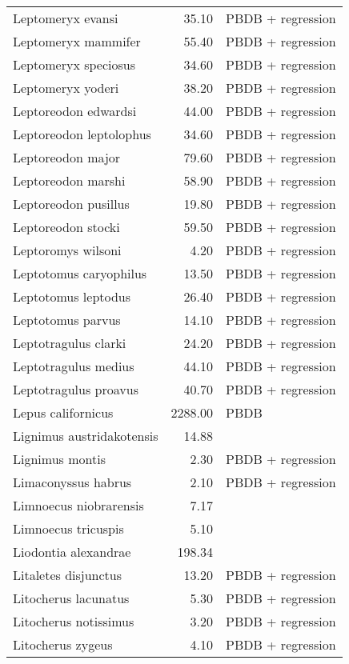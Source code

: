 \begin{table}[ht]
\begin{tabular}{lrl}
  Leptomeryx evansi & 35.10 & PBDB + regression \\ 
  Leptomeryx mammifer & 55.40 & PBDB + regression \\ 
  Leptomeryx speciosus & 34.60 & PBDB + regression \\ 
  Leptomeryx yoderi & 38.20 & PBDB + regression \\ 
  Leptoreodon edwardsi & 44.00 & PBDB + regression \\ 
  Leptoreodon leptolophus & 34.60 & PBDB + regression \\ 
  Leptoreodon major & 79.60 & PBDB + regression \\ 
  Leptoreodon marshi & 58.90 & PBDB + regression \\ 
  Leptoreodon pusillus & 19.80 & PBDB + regression \\ 
  Leptoreodon stocki & 59.50 & PBDB + regression \\ 
  Leptoromys wilsoni & 4.20 & PBDB + regression \\ 
  Leptotomus caryophilus & 13.50 & PBDB + regression \\ 
  Leptotomus leptodus & 26.40 & PBDB + regression \\ 
  Leptotomus parvus & 14.10 & PBDB + regression \\ 
  Leptotragulus clarki & 24.20 & PBDB + regression \\ 
  Leptotragulus medius & 44.10 & PBDB + regression \\ 
  Leptotragulus proavus & 40.70 & PBDB + regression \\ 
  Lepus californicus & 2288.00 & PBDB \\ 
  Lignimus austridakotensis & 14.88 & \cite{Tomiya2013} \\ 
  Lignimus montis & 2.30 & PBDB + regression \\ 
  Limaconyssus habrus & 2.10 & PBDB + regression \\ 
  Limnoecus niobrarensis & 7.17 & \cite{Tomiya2013} \\ 
  Limnoecus tricuspis & 5.10 & \cite{Tomiya2013} \\ 
  Liodontia alexandrae & 198.34 & \cite{Tomiya2013} \\ 
  Litaletes disjunctus & 13.20 & PBDB + regression \\ 
  Litocherus lacunatus & 5.30 & PBDB + regression \\ 
  Litocherus notissimus & 3.20 & PBDB + regression \\ 
  Litocherus zygeus & 4.10 & PBDB + regression \\ 

\end{tabular}
\end{table}
